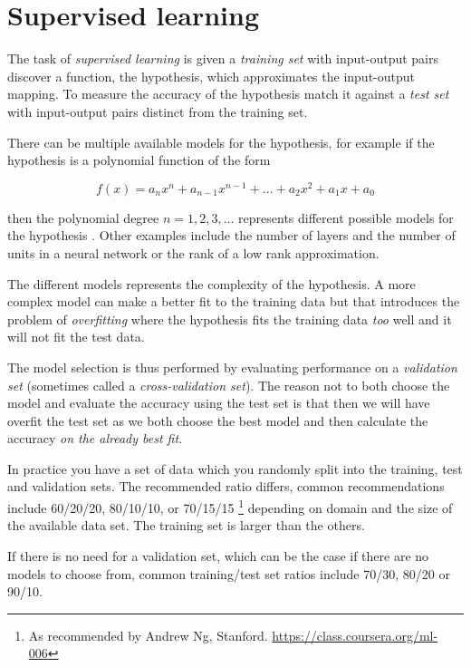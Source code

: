 
\section{Supervised learning}\label{sec:theory:suplearn}

The task of \textit{supervised learning} is given a \textit{training set} with input-output pairs discover a function, the hypothesis, which approximates the input-output mapping.  To measure the accuracy of the hypothesis match it against a \textit{test set} with input-output pairs distinct from the training set.
\citep{norvigAI}

There can be multiple available models for the hypothesis, for example if the hypothesis is a polynomial function of the form 

\begin{equation}
f(x) = a_n x^n + a_{n - 1} x^{n - 1} + ... + a_2 x^2 + a_1 x + a_0
\end{equation}

then the polynomial degree $n = 1, 2, 3, ...$ represents different possible models for the hypothesis \citep{norvigAI}. Other examples include the number of layers and the number of units in a neural network or the rank of a low rank approximation.

The different models represents the complexity of the hypothesis. A more complex model can make a better fit to the training data but that introduces the problem of \textit{overfitting} where the hypothesis fits the training data \textit{too} well and it will not fit the test data.
\citep{norvigAI}

The model selection is thus performed by evaluating performance on a \textit{validation set} (sometimes called a \textit{cross-validation set}). The reason not to both choose the model and evaluate the accuracy using the test set is that then we will have overfit the test set as we both choose the best model and then calculate the accuracy \textit{on the already best fit}.
\citep{norvigAI}

In practice you have a set of data which you randomly split into the training, test and validation sets. The recommended ratio differs, common recommendations include 60/20/20, 80/10/10, or 70/15/15 \footnote{As recommended by Andrew Ng, Stanford. \url{https://class.coursera.org/ml-006}} depending on domain and the size of the available data set. The training set is larger than the others.

If there is no need for a validation set, which can be the case if there are no models to choose from, common training/test set ratios include 70/30, 80/20 \cite{hu2008collaborative} or 90/10.



